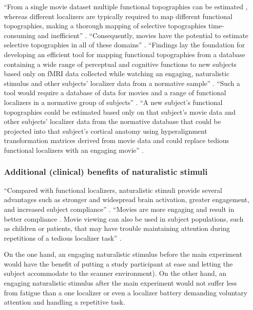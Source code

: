 ``From a single movie dataset multiple functional topographies can be estimated
\citep{guntupalli2016model}, whereas different localizers are typically required
to map different functional topographies, making a thorough mapping of selective
topographies time-consuming and inefficient'' \citep{jiahui2020predicting}.
%
``Consequently, movies have the potential to estimate selective topographies in
all of these domains'' \citep{jiahui2020predicting}.
%
``Findings lay the foundation for developing an efficient tool for mapping
functional topographies from a database containing a wide range of perceptual
and cognitive functions to new subjects based only on fMRI data collected while
watching an engaging, naturalistic stimulus and other subjects' localizer data
from a normative sample'' \citep{jiahui2020predicting}.
%
``Such a tool would require a database of data for movies and a range of
functional localizers in a normative group of subjects''
\citep{jiahui2020predicting}.
%
``A new subject's functional topographies could be estimated based only on that
subject's movie data and other subjects' localizer data from the normative
database that could be projected into that subject's cortical anatomy using
hyperalignment transformation matrices derived from movie data and could replace
tedious functional localizers with an engaging movie''
\citep{jiahui2020predicting}.


\subsubsection{Additional (clinical) benefits of naturalistic stimuli}

``Compared with functional localizers, naturalistic stimuli provide several
advantages such as stronger and widespread brain activation, greater engagement,
and increased subject compliance'' \citep{jiahui2020predicting}.
%
``Movies are more engaging and result in better compliance
\citep{vanderwal2015inscapes}.
%
Movie viewing can also be used in subject populations, such as children
\citep{richardson2018development} or patients, that may have trouble maintaining
attention during repetitions of a tedious localizer task''
\citep{jiahui2020predicting}.

%
On the one hand, an engaging naturalistic stimulus before the main experiment
would have the benefit of putting a study participant at ease and letting the
subject accommodate to the scanner environment).
%
On the other hand, an engaging naturalistic stimulus after the main experiment
would not suffer less from fatigue than a one localizer or even a localizer
battery demanding voluntary attention and handling a repetitive task.


